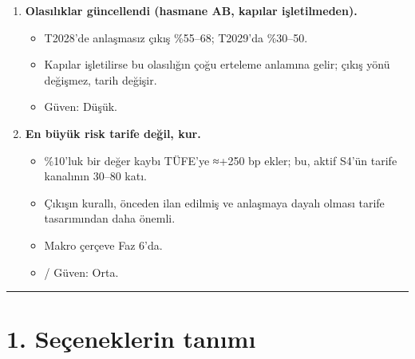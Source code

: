 \begin{enumerate}
  \begin{itemize}
  \tightlist
  \item
    NANDO'da 95 Türk kaydı var; ≈81'i yürürlükte.
  \item
    Süreklilik hükmü olmadan Türk sertifikaları çıkış günü AB'de geçersiz olur (İngiltere 2020, İsviçre 2021 dersleri).
  \item
    Dondurma kararına ve ITA'ya ``büyükbaba'' hükmü konmalı.
  \item
    \etiketV{} Güven: Yüksek.
  \end{itemize}
\item
  \textbf{Olasılıklar güncellendi (hasmane AB, kapılar işletilmeden).}

  \begin{itemize}
  \tightlist
  \item
    T2028'de anlaşmasız çıkış \%55--68; T2029'da \%30--50.
  \item
    Kapılar işletilirse bu olasılığın çoğu erteleme anlamına gelir; çıkış yönü değişmez, tarih değişir.
  \item
    \etiketH{} Güven: Düşük.
  \end{itemize}
\item
  \textbf{En büyük risk tarife değil, kur.}

  \begin{itemize}
  \tightlist
  \item
    \%10'luk bir değer kaybı TÜFE'ye ≈+250 bp ekler; bu, aktif S4'ün tarife kanalının 30--80 katı.
  \item
    Çıkışın kurallı, önceden ilan edilmiş ve anlaşmaya dayalı olması tarife tasarımından daha önemli.
  \item
    Makro çerçeve Faz 6'da.
  \item
    \etiketV{}/\etiketH{} Güven: Orta.
  \end{itemize}
\end{enumerate}

\begin{center}\rule{0.5\linewidth}{0.5pt}\end{center}

\hypertarget{02b_secenekler_hukuk-1-seuxe7eneklerin-tanux131mux131}{%
\section{1. Seçeneklerin tanımı}\label{02b_secenekler_hukuk-1-seuxe7eneklerin-tanux131mux131}}

